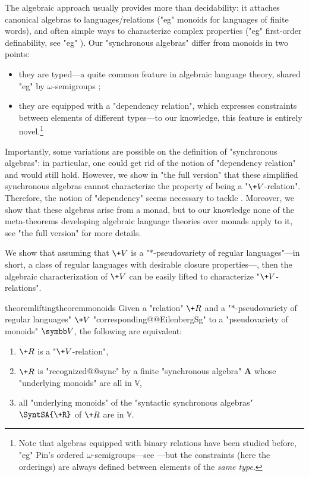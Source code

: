 The algebraic approach usually provides more than decidability: it attaches
canonical algebras to languages/relations ("eg" monoids for languages of finite words), and often simple ways to characterize complex properties ("eg" first-order definability, see "eg" \cite[Theorem 2.6, p.~40]{bojanczyk_languages_2020}).
Our "synchronous algebras" differ from monoids in two points:
\begin{itemize}
	\item they are typed---a quite common feature in algebraic language theory, shared "eg" by $\omega$-semigroups \cite[\S 4.1, p.~91]{perrin_infinite_2004};
	\item they are equipped with a "dependency relation", which expresses constraints between 
	elements of different types---to our knowledge, this feature is entirely novel.\footnote{Note that algebras equipped with binary relations have been studied before, "eg" Pin's ordered 
	$\omega$-semigroups---see \cite[\S 2.4, p.~7]{pin_positive_1998}---but the constraints (here the 
	orderings) are always defined between elements of the \emph{same type}.}
\end{itemize}

Importantly, some variations are possible on the definition of "synchronous algebras":
in particular, one could get rid of the notion of "dependency relation" and 
 would still hold.
However, we show in "the full version" that these
simplified synchronous algebras cannot characterize the property of being a "$\+V$-relation".
Therefore, the notion of "dependency" seems necessary to tackle .
Moreover, we show that these algebras arise from a monad, but to our knowledge none of the 
meta-theorems developing algebraic language theories over monads apply to it,
see "the full version" for more details.

We show that assuming that $\+V$ is a "$*$-pseudovariety of regular languages"---in short, a class of regular languages with desirable closure properties---, then the algebraic characterization of $\+V$ can be easily lifted to characterize "$\+V$-relations".

\begin{restatable*}{theorem}{liftingtheoremmonoids}
	\label{thm:lifting-theorem-monoids}
	Given a "relation" $\+R$ and a "$\ast$-pseudovariety of regular languages" $\+V$
	"corresponding@@EilenbergSg" to a "pseudovariety of monoids" $\B{V}$,
	the following are equivalent:
	\begin{enumerate}
		\item $\+R$ is a "$\+V$-relation",
		\item $\+R$ is "recognized@@sync" by a finite "synchronous algebra" $\mathbf{A}$
			whose "underlying monoids" are all in $\mathbb{V}$,
		\item all "underlying monoids" of the "syntactic synchronous algebras" $\SyntSA{\+R}$ of
			$\+R$ are in $\mathbb{V}$.
	\end{enumerate} 
\end{restatable*}


